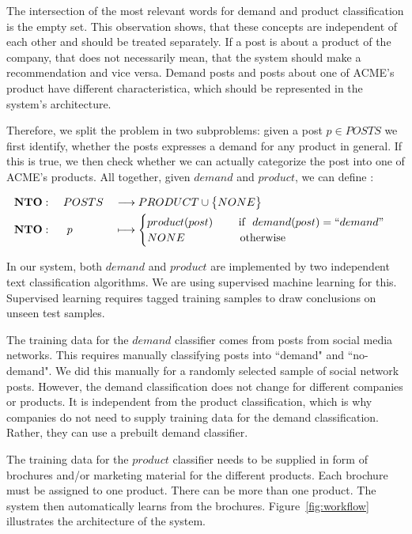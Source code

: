 The intersection of the most relevant words for demand and product classification is the empty set.
This observation shows, that these concepts are independent of each other and should be treated separately.
If a post is about a product of the company, that does not necessarily mean, that the system should make a recommendation and vice versa.
Demand posts and posts about one of ACME's product have different characteristica, which should be represented in the system's architecture.

Therefore, we split the \nto problem in two subproblems: given a post $p \in POSTS$ we first identify, whether the posts expresses a demand for any product in general.
If this is true, we then check whether we can actually categorize the post into one of ACME's products.
All together, given $demand$ and $product$, we can define \nto:

\begin{alignat*}{3}
  &\mathbf{NTO}: && ~POSTS && \longrightarrow PRODUCT \cup \big\{ NONE \big\} \\
  &\mathbf{NTO}: && ~~p   && \longmapsto \begin{cases}
	    product(post)~~~~~~~\text{if }~demand(post) = ``demand" \\
	    NONE~~~~~~~~~~~~~~~\text{otherwise}
   \end{cases}
\end{alignat*}

In our system, both $demand$ and $product$ are implemented by two independent text classification algorithms.
We are using supervised machine learning for this.
Supervised learning requires tagged training samples to draw conclusions on unseen test samples.

The training data for the $demand$ classifier comes from posts from social media networks.
This requires manually classifying posts into ``demand" and ``no-demand".
We did this manually for a randomly selected sample of social network posts.
However, the demand classification does not change for different companies or products.
It is independent from the product classification, which is why companies do not need to supply training data for the demand classification.
Rather, they can use a prebuilt demand classifier.

The training data for the $product$ classifier needs to be supplied in form of brochures and/or marketing material for the different products.
Each brochure must be assigned to one product.
There can be more than one product.
The system then automatically learns from the brochures.
Figure~\ref{fig:workflow} illustrates the architecture of the system.

